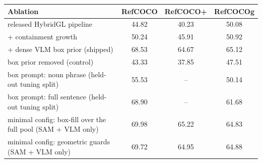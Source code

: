 \begin{tabular}{lccc}
\toprule
Ablation & RefCOCO & RefCOCO+ & RefCOCOg \\
\midrule
released HybridGL pipeline & 44.82 & 40.23 & 50.08 \\
+ containment growth & 50.24 & 45.91 & 50.92 \\
+ dense VLM box prior (shipped) & 68.53 & 64.67 & 65.12 \\
box prior removed (control) & 43.33 & 37.85 & 47.51 \\
box prompt: noun phrase (held-out tuning split) & 55.53 & -- & 50.14 \\
box prompt: full sentence (held-out tuning split) & 68.90 & -- & 61.68 \\
minimal config: box-fill over the full pool (SAM + VLM only) & 69.98 & 65.22 & 64.83 \\
minimal config: geometric guards (SAM + VLM only) & 69.72 & 64.95 & 64.88 \\
\bottomrule
\end{tabular}
